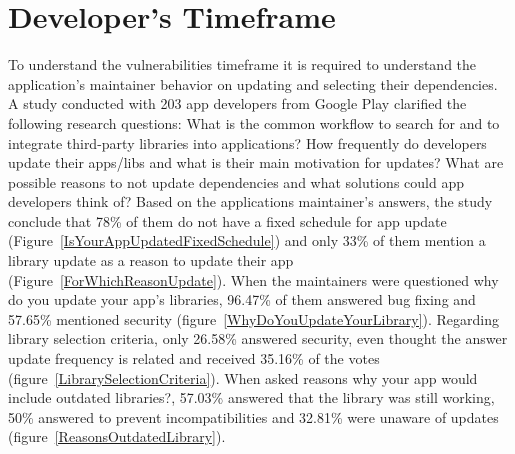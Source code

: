 \documentclass[pdf,bookmarks,colorlinks=true]{IEEEtran}
\begin{document}

\section{Developer's Timeframe}
\label{sec:DevelopersTimeFrame}


To understand the vulnerabilities timeframe it is required to understand the application's maintainer behavior on updating and selecting their dependencies. A study \cite{Derr2017} conducted with 203 app developers from Google Play clarified the following research questions: What is the common workflow to search for and to integrate third-party libraries into applications? How frequently do developers update their apps/libs and what is their main motivation for updates?
What are possible reasons to not update dependencies and what solutions could app developers think of?
Based on the applications maintainer's answers, the study conclude that 78\% of them do not have a fixed schedule for app update (Figure~\ref{IsYourAppUpdatedFixedSchedule}) and only 33\% of them mention a library update as a reason to update their app (Figure~\ref{ForWhichReasonUpdate}). When the maintainers were questioned why do you update your app's libraries, 96.47\% of them answered bug fixing and 57.65\% mentioned security (figure~\ref{WhyDoYouUpdateYourLibrary}). Regarding library selection criteria, only 26.58\% answered security, even thought the answer update frequency is related and received 35.16\% of the votes (figure~\ref{LibrarySelectionCriteria}). When asked reasons why your app would include outdated libraries?, 57.03\% answered that the library was still working, 50\% answered to prevent incompatibilities and 32.81\% were unaware of updates (figure~\ref{ReasonsOutdatedLibrary}).
\end{document}
